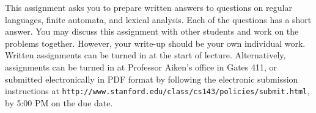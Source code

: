 \documentclass[11pt]{article}
\begin{document}

This assignment asks you to prepare written answers to questions on
regular languages, finite automata, and lexical analysis.  Each of the
questions has a short answer.  You may discuss this assignment with
other students and work on the problems together.  However, your
write-up should be your own individual work.  Written assignments can
be turned in at the start of lecture.  Alternatively, assignments can
be turned in at Professor Aiken's office in Gates 411, or submitted
electronically in PDF format by following the electronic submission
instructions at
\texttt{http://www.stanford.edu/class/cs143/policies/submit.html}, by
5:00 PM on the due date.

\bigskip
\bigskip
\end{document}
